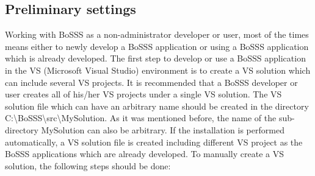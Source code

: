 \documentclass[11pt,twoside,a4paper]{fdyartcl}
\begin{document}
\subsection{Preliminary settings}
Working with BoSSS as a non-administrator developer or user, most of the times means either to newly develop a BoSSS application or using a BoSSS application which is already developed. The first step to develop or use a BoSSS application in the VS (Microsoft Visual Studio) environment is to create a VS solution which can include several VS projects. It is recommended that a BoSSS developer or user creates all of his/her VS projects under a single VS solution. The VS solution file which can have an arbitrary name should be created in the directory {\scriptsize C:\textbackslash BoSSS\textbackslash src\textbackslash MySolution}. As it was mentioned before, the name of the sub-directory {\scriptsize MySolution} can also be arbitrary. If the installation is performed automatically, a VS solution file is created including different VS project as the BoSSS applications which are already developed. To manually create a VS solution, the following steps should be done:
\end{document}
